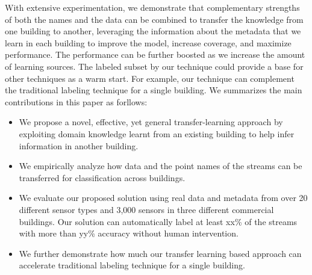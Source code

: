 With extensive experimentation, we demonstrate that complementary strengths of both the names and the data can be combined to
transfer the knowledge from one building to another, leveraging the information about the metadata that
we learn in each building to improve the model, increase coverage, and maximize performance. 
The performance can be further boosted as we increase the amount of learning sources.
The labeled subset by our technique could provide a base for other techniques as a warm start.
For example, our technique can complement the traditional labeling technique for a single building.
We summarizes the main contributions in this paper as forllows:
\begin{itemize}\itemsep1pt \parskip1pt 
\item We propose a novel, effective, yet general transfer-learning approach by exploiting domain knowledge learnt from an existing building to help infer information in another building.
\item We empirically analyze how data and the point names of the streams can be transferred for classification across buildings.
\item We evaluate our proposed solution using real data and metadata from over 20 different sensor types and 3,000 sensors in three different commercial buildings.  Our solution can automatically label at least xx\% of the streams with more than yy\% accuracy without human intervention.
\item We further demonstrate how much our transfer learning based approach can accelerate traditional labeling technique for a single building.
\end{itemize}
